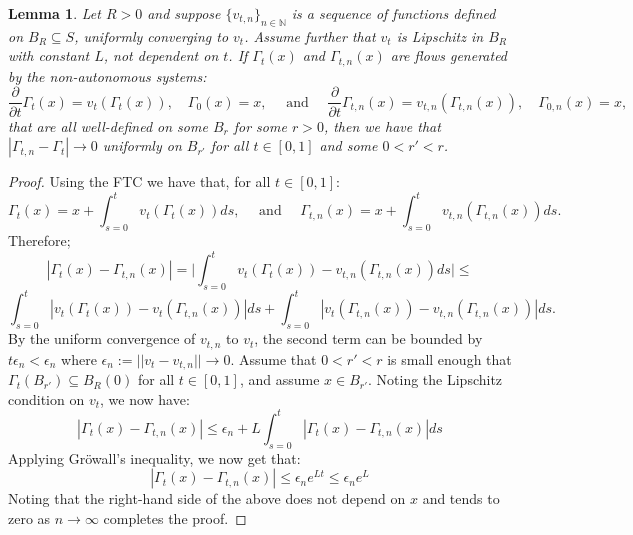 \documentclass[11pt]{article}
\newcommand{\1}{\mathbf{1}}
\newtheorem{lemma}{Lemma}%
\theoremstyle{definition}
\theoremstyle{remark}
\begin{document}
\begin{mdframed}
    \begin{lemma}\label{lem:flow_conv}
        Let $R>0$ and suppose $\{v_{t,n}\}_{n\in\mathbb{N}}$ is a sequence of functions defined on $B_R\subseteq S$, uniformly converging to $v_t$. Assume further that $v_t$ is Lipschitz in $B_R$ with constant $L$, not dependent on $t$. If $\Gamma_t(x)$ and $\Gamma_{t,n}(x)$ are flows generated by the non-autonomous systems:
\begin{equation}\nonumber
    \frac{\partial }{\partial t}\Gamma_t(x) = v_t(\Gamma_t(x)), \quad \Gamma_0(x)=x, \quad \text{ and } \quad \frac{\partial }{\partial t}\Gamma_{t,n}(x) = v_{t,n}(\Gamma_{t,n}(x)), \quad \Gamma_{0,n}(x)=x,
\end{equation}
that are all well-defined on some $B_r$ for some $r>0$, then we have that $|\Gamma_{t,n}-\Gamma_t|\rightarrow 0$ uniformly on $B_{r'}$ for all $t\in [0,1]$ and some $0<r'<r$.
    \end{lemma}
    \vspace{0.2cm}
\end{mdframed}
\begin{proof}
    Using the FTC we have that, for all $t\in[0,1]$:
    \begin{equation}\nonumber
        \Gamma_t(x) = x + \int_{s=0}^{t} v_t(\Gamma_t(x)) ds, \quad \text{ and }\quad\Gamma_{t,n}(x) = x + \int_{s=0}^{t} v_{t,n}(\Gamma_{t,n}(x)) ds.
    \end{equation}
    Therefore;
    \begin{equation}\nonumber
        |\Gamma_t(x) -\Gamma_{t,n}(x)| = \bigg|\int_{s=0}^{t} v_{t}(\Gamma_{t}(x)) - v_{t,n}(\Gamma_{t,n}(x)) ds\bigg| \leq
    \end{equation}
    \begin{equation}\nonumber
    \int_{s=0}^{t} |v_{t}(\Gamma_{t}(x)) - v_{t}(\Gamma_{t,n}(x))| ds+\int_{s=0}^{t} |v_{t}(\Gamma_{t,n}(x)) - v_{t,n}(\Gamma_{t,n}(x))| ds.
    \end{equation}
    By the uniform convergence of $v_{t,n}$ to $v_t$, the second term can be bounded by $t\epsilon_n<\epsilon_n$ where $\epsilon_n:=||v_t-v_{t,n}||\rightarrow 0$. Assume that $0<r'<r$ is small enough that $\Gamma_t(B_{r'})\subseteq B_{R}(0)$ for all $t\in [0,1]$, and assume $x \in B_{r'}$. Noting the Lipschitz condition on $v_t$, we now have:
    \begin{equation}\nonumber
        |\Gamma_t(x) -\Gamma_{t,n}(x)| \leq \epsilon_n +
    L \int_{s=0}^{t} |\Gamma_{t}(x) - \Gamma_{t,n}(x)| ds
    \end{equation}
    Applying Gr\"{o}wall's inequality, we now get that:
    \begin{equation}\nonumber
        |\Gamma_t(x) -\Gamma_{t,n}(x)| \leq \epsilon_n e^{Lt} \leq \epsilon_n e^{L}
    \end{equation}
    Noting that the right-hand side of the above does not depend on $x$ and tends to zero as $n\rightarrow \infty$ completes the proof.
\end{proof}
\end{document}
